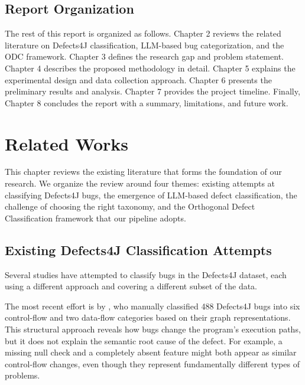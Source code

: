 \documentclass{iutbscthesis}
\begin{document}
\section{Report Organization}

The rest of this report is organized as follows. Chapter 2 reviews the related literature on Defects4J classification, LLM-based bug categorization, and the ODC framework. Chapter 3 defines the research gap and problem statement. Chapter 4 describes the proposed methodology in detail. Chapter 5 explains the experimental design and data collection approach. Chapter 6 presents the preliminary results and analysis. Chapter 7 provides the project timeline. Finally, Chapter 8 concludes the report with a summary, limitations, and future work.


\chapter{Related Works}

This chapter reviews the existing literature that forms the foundation of our research. We organize the review around four themes: existing attempts at classifying Defects4J bugs, the emergence of LLM-based defect classification, the challenge of choosing the right taxonomy, and the Orthogonal Defect Classification framework that our pipeline adopts.

\section{Existing Defects4J Classification Attempts}

Several studies have attempted to classify bugs in the Defects4J dataset, each using a different approach and covering a different subset of the data.

The most recent effort is by \textcite{vanderspuy2025anatomy}, who manually classified 488 Defects4J bugs into six control-flow and two data-flow categories based on their graph representations. This structural approach reveals how bugs change the program's execution paths, but it does not explain the semantic root cause of the defect. For example, a missing null check and a completely absent feature might both appear as similar control-flow changes, even though they represent fundamentally different types of problems.
\end{document}
